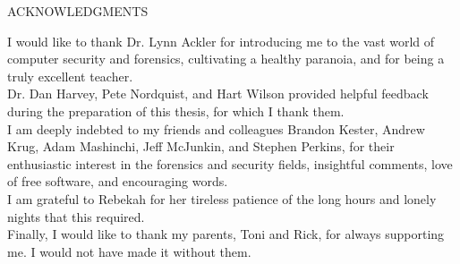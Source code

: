 \onehalfspacing
\begin{center}
ACKNOWLEDGMENTS \\[36pt]
\end{center}

\noindent
I would like to thank Dr. Lynn Ackler for introducing me to the vast world of computer security and forensics, cultivating a healthy
paranoia, and for being a truly excellent teacher.  \\[12pt]

\noindent 
Dr. Dan Harvey, Pete Nordquist, and Hart Wilson provided helpful feedback during the preparation of this thesis, for which
I thank them. \\[12pt]

\noindent
I am deeply indebted to my friends and colleagues Brandon Kester, Andrew Krug, Adam Mashinchi, Jeff McJunkin, and Stephen Perkins,
for their enthusiastic interest in the forensics and security fields, insightful comments, love of free software, and encouraging
words. \\[12pt]
 
\noindent
I am grateful to Rebekah for her tireless patience of the long hours and lonely nights that this required. \\[12pt]
 
\noindent
Finally, I would like to thank my parents, Toni and Rick, for always supporting me. I would not have made it without them. \\[12pt]

\restoregeometry
